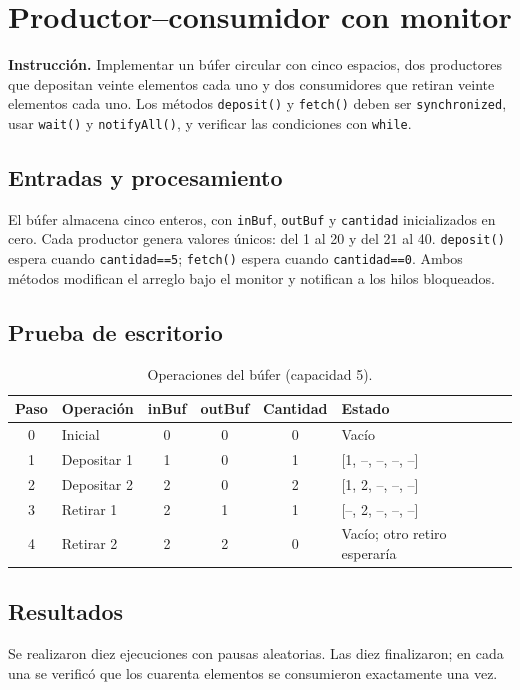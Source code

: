 \documentclass[12pt]{report}
\begin{document}
\tableofcontents
\listoffigures
\listoftables

\chapter{Productor--consumidor con monitor}
\textbf{Instrucción.} Implementar un búfer circular con cinco espacios, dos productores que depositan veinte elementos cada uno y dos consumidores que retiran veinte elementos cada uno. Los métodos \texttt{deposit()} y \texttt{fetch()} deben ser \texttt{synchronized}, usar \texttt{wait()} y \texttt{notifyAll()}, y verificar las condiciones con \texttt{while}.

\section{Entradas y procesamiento}
El búfer almacena cinco enteros, con \texttt{inBuf}, \texttt{outBuf} y \texttt{cantidad} inicializados en cero. Cada productor genera valores únicos: del 1 al 20 y del 21 al 40. \texttt{deposit()} espera cuando \texttt{cantidad==5}; \texttt{fetch()} espera cuando \texttt{cantidad==0}. Ambos métodos modifican el arreglo bajo el monitor y notifican a los hilos bloqueados.

\section{Prueba de escritorio}
\begin{table}[H]\centering\caption{Operaciones del búfer (capacidad 5).}
\begin{tabularx}{\textwidth}{c X c c c X}\toprule
Paso & Operación & inBuf & outBuf & Cantidad & Estado\\\midrule
0 & Inicial & 0 & 0 & 0 & Vacío\\
1 & Depositar 1 & 1 & 0 & 1 & [1, --, --, --, --]\\
2 & Depositar 2 & 2 & 0 & 2 & [1, 2, --, --, --]\\
3 & Retirar 1 & 2 & 1 & 1 & [--, 2, --, --, --]\\
4 & Retirar 2 & 2 & 2 & 0 & Vacío; otro retiro esperaría\\\bottomrule
\end{tabularx}\end{table}

\section{Resultados}
Se realizaron diez ejecuciones con pausas aleatorias. Las diez finalizaron; en cada una se verificó que los cuarenta elementos se consumieron exactamente una vez.
\end{document}
